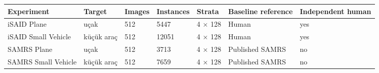 \begin{tabular}{lllllll}
\toprule
Experiment & Target & Images & Instances & Strata & Baseline reference & Independent human \\
\midrule
iSAID Plane & uçak & 512 & 5447 & 4 × 128 & Human & yes \\
iSAID Small Vehicle & küçük araç & 512 & 12051 & 4 × 128 & Human & yes \\
SAMRS Plane & uçak & 512 & 3713 & 4 × 128 & Published SAMRS & no \\
SAMRS Small Vehicle & küçük araç & 512 & 7659 & 4 × 128 & Published SAMRS & no \\
\bottomrule
\end{tabular}
